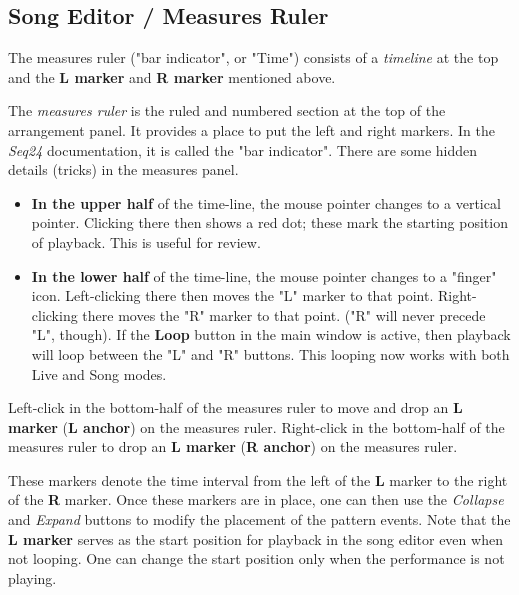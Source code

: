 \subsection{Song Editor / Measures Ruler}
\label{subsec:song_editor_measures_ruler}

   The measures ruler ("bar indicator", or "Time")
   consists of a \textsl{timeline} at the top and the 
   \textbf{L marker} and \textbf{R marker} mentioned above.

   The \textsl{measures ruler} is the ruled and numbered section at the top
   of the arrangement panel.  It provides a place to put the left and right
   markers.  In the \textsl{Seq24} documentation, it is called the "bar
   indicator".
   There are some hidden details (tricks) in the measures panel.

   \begin{itemize}
      \item \textbf{In the upper half} of the time-line,
         the mouse pointer changes to a vertical pointer.
         Clicking there then shows a red dot; these mark
         the starting position of playback.
         This is useful for review.
      \item \textbf{In the lower half} of the time-line,
         the mouse pointer changes to a "finger" icon.
         Left-clicking there then moves the "L" marker to that point.
         Right-clicking there moves the "R" marker to that point.
         ("R" will never precede "L", though).
         If the \textbf{Loop} button in the main window is active, then
         playback will loop between the "L" and "R" buttons.
         This looping now works with both Live and Song modes.
   \end{itemize}

   Left-click in the bottom-half of the measures ruler to move and drop an
   \textbf{L marker} (\textbf{L anchor}) on the measures ruler.
   Right-click in the bottom-half of the measures ruler to drop an
   \textbf{L marker} (\textbf{R anchor}) on the measures ruler.
   
   These markers denote the time interval from the left of the 
   \textbf{L} marker to the right of the \textbf{R} marker.
   Once these markers are in place, one can then use
	the \textsl{Collapse} and \textsl{Expand} buttons to modify the
   placement of the pattern events.
   Note that the \textbf{L marker} serves as the start position for playback
   in the song editor even when not looping.
   One can change the start position only when the
   performance is not playing.

